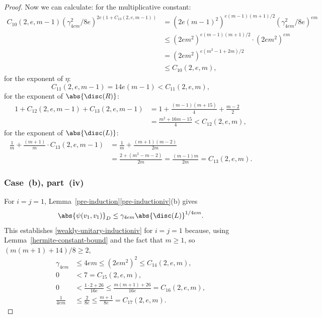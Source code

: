 \begin{proof}
Now we can calculate:
for the multiplicative constant:
\begin{align*}
C_{10}(2,e,m-1) (\gamma_{4em}^2/8e)^{2e(1+C_{13}(2,e,m-1))}
& = (2e(m-1)^2)^{e(m-1)(m+1)/2} (\gamma_{4em}^2/8e)^{em}
\\& \leq (2em^2)^{e(m-1)(m+1)/2} \cdot (2em^2)^{em}
\\& = (2em^2)^{e(m^2-1 + 2m)/2}
\\& \leq C_{10}(2,e,m),
\end{align*}
for the exponent of $\eta$:
\[
C_{11}(2,e,m-1) = 14e(m-1) < C_{11}(2,e,m),
\]
for the exponent of $\abs{\disc(R)}$:
\begin{align*}
1 + C_{12}(2,e,m-1) + C_{13}(2,e,m-1)
& = 1 + \frac{(m-1)(m+15)}{4} + \frac{m-2}{2}
\\& = \frac{m^2+16m-15}{4} < C_{12}(2,e,m),
\end{align*}
for the exponent of $\abs{\disc(L)}$:
\begin{align*}
\frac{1}{m} + \frac{(m+1)}{m} \cdot C_{13}(2,e,m-1)
& = \frac{1}{m} + \frac{(m+1)(m-2)}{2m}
\\& = \frac{2+(m^2-m-2)}{2m} = \frac{(m-1)m}{2m} = C_{13}(2,e,m).
\end{align*}

\subsubsection*{Case~(b), part~(iv)}
For $i=j=1$, Lemma~\ref{pre-induction}\eqref{pre-inductioniv}(b) gives
\begin{equation} \label{eqn:case-b-iv-base}
\abs{\psi(v_1, v_1)}_D \leq \gamma_{4em} \abs{\disc(L)}^{1/4em}.
\end{equation}
This establishes \eqref{weakly-unitary-inductioniv} for $i=j=1$ because, using Lemma~\ref{hermite-constant-bound} and the fact that $m \geq 1$, so $(m(m+1)+14)/8 \geq 2$,
\begin{align*}
\gamma_{4em}
& \leq 4em \leq (2em^2)^2 \leq C_{14}(2,e,m),
\\[3pt] 0 & < 7 = C_{15}(2,e,m),
\\ 0 & < \frac{1 \cdot 2 + 26}{16e} \leq \frac{m(m+1)+26}{16e} = C_{16}(2,e,m),
\\ \frac{1}{4em} & \leq \frac{2}{8e} \leq \frac{m+1}{8e} = C_{17}(2,e,m).
\end{align*}


\end{proof}
